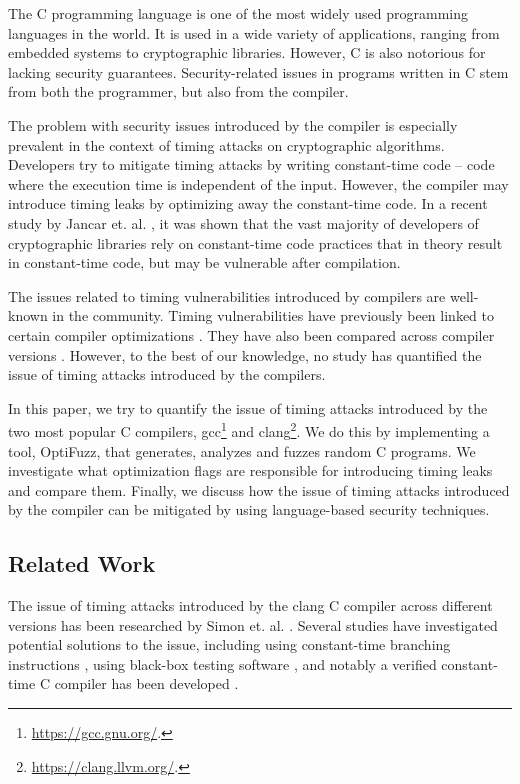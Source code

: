 The C programming language is one of the most widely used programming languages in the world. 
It is used in a wide variety of applications, ranging from embedded systems to cryptographic libraries. 
However, C is also notorious for lacking security guarantees.
Security-related issues in programs written in C stem from both the programmer, but also from the compiler.

The problem with security issues introduced by the compiler is especially prevalent in the context of timing attacks on cryptographic algorithms. 
Developers try to mitigate timing attacks by writing constant-time code -- code where the execution time is independent of the input.
However, the compiler may introduce timing leaks by optimizing away the constant-time code.
In a recent study by Jancar et. al. \cite{developer-survey-timing-attacks}, it was shown that the vast majority of developers of cryptographic libraries rely on constant-time code practices that in theory result in constant-time code, but may be vulnerable after compilation.

The issues related to timing vulnerabilities introduced by compilers are well-known in the community.
Timing vulnerabilities have previously been linked to certain compiler optimizations \cite{optimizations-linked-to-timing-attacks}.
They have also been compared across compiler versions \cite{what-you-c}.
However, to the best of our knowledge, no study has quantified the issue of timing attacks introduced by the compilers.

In this paper, we try to quantify the issue of timing attacks introduced by the two most popular C compilers, gcc\footnote{\url{https://gcc.gnu.org/}.} and clang\footnote{\url{https://clang.llvm.org/}.}.
We do this by implementing a tool, OptiFuzz, that generates, analyzes and fuzzes random C programs.
We investigate what optimization flags are responsible for introducing timing leaks and compare them.
Finally, we discuss how the issue of timing attacks introduced by the compiler can be mitigated by using language-based security techniques.

\subsection{Related Work}
The issue of timing attacks introduced by the clang C compiler across different versions has been researched by Simon et. al. \cite{what-you-c}. 
Several studies have investigated potential solutions to the issue, including using constant-time branching instructions \cite{what-you-c}, using black-box testing software \cite{dudect}, and notably a verified constant-time C compiler has been developed \cite{verified-constant-time-c-comiler}.

